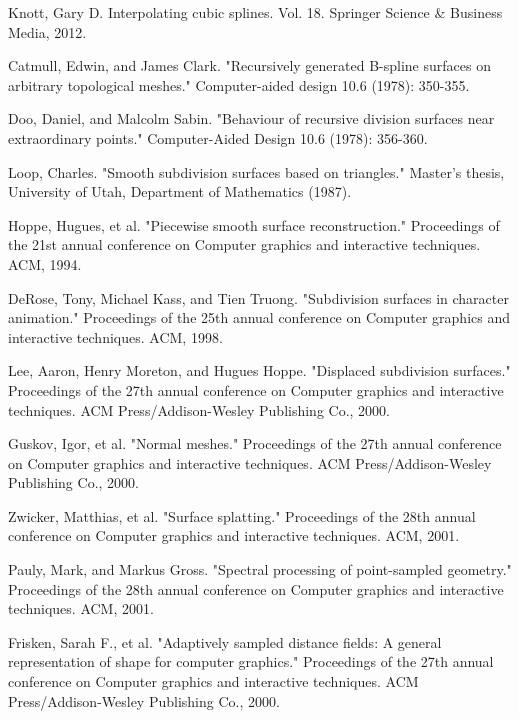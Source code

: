 \documentclass[11pt]{article}
\begin{document}
\begin{thebibliography}{1}
 Knott, Gary D. Interpolating cubic splines. Vol. 18. Springer Science \& Business Media, 2012.

Catmull, Edwin, and James Clark. "Recursively generated B-spline surfaces on arbitrary topological meshes." Computer-aided design 10.6 (1978): 350-355.

 Doo, Daniel, and Malcolm Sabin. "Behaviour of recursive division surfaces near extraordinary points." Computer-Aided Design 10.6 (1978): 356-360.

 Loop, Charles. "Smooth subdivision surfaces based on triangles." Master's thesis, University of Utah, Department of Mathematics (1987).

 Hoppe, Hugues, et al. "Piecewise smooth surface reconstruction." Proceedings of the 21st annual conference on Computer graphics and interactive techniques. ACM, 1994.

 DeRose, Tony, Michael Kass, and Tien Truong. "Subdivision surfaces in character animation." Proceedings of the 25th annual conference on Computer graphics and interactive techniques. ACM, 1998.

 Lee, Aaron, Henry Moreton, and Hugues Hoppe. "Displaced subdivision surfaces." Proceedings of the 27th annual conference on Computer graphics and interactive techniques. ACM Press/Addison-Wesley Publishing Co., 2000.

 Guskov, Igor, et al. "Normal meshes." Proceedings of the 27th annual conference on Computer graphics and interactive techniques. ACM Press/Addison-Wesley Publishing Co., 2000.

Zwicker, Matthias, et al. "Surface splatting." Proceedings of the 28th annual conference on Computer graphics and interactive techniques. ACM, 2001.

\bibitem{} Pauly, Mark, and Markus Gross. "Spectral processing of point-sampled geometry." Proceedings of the 28th annual conference on Computer graphics and interactive techniques. ACM, 2001.

 Frisken, Sarah F., et al. "Adaptively sampled distance fields: A general representation of shape for computer graphics." Proceedings of the 27th annual conference on Computer graphics and interactive techniques. ACM Press/Addison-Wesley Publishing Co., 2000.

\end{thebibliography}
\end{document}
